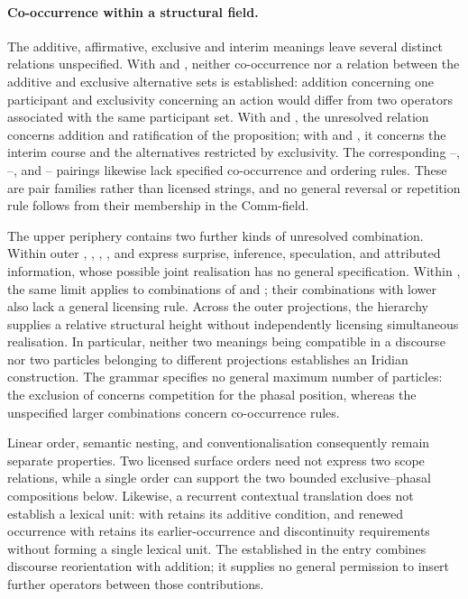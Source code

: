 \paragraph{Co-occurrence within a structural field.}
The additive, affirmative, exclusive and interim meanings leave several distinct relations
unspecified. With  and , neither
co-occurrence nor a relation between the additive and exclusive alternative
sets is established: addition concerning one participant and exclusivity
concerning an action would differ from two operators associated with the
same participant set. With  and , the unresolved
relation concerns addition and ratification of the proposition; with
 and , it concerns the interim course
and the alternatives restricted by exclusivity. The corresponding
--, --, and
-- pairings likewise lack specified
co-occurrence and ordering rules. These are pair families rather than
licensed strings, and no general reversal or repetition rule follows from
their membership in the Comm-field.

The upper periphery contains two further kinds of unresolved combination.
Within outer , , , ,
and  express surprise, inference, speculation, and attributed
information, whose possible joint realisation has no general specification.
Within , the same limit applies to combinations of
 and ; their combinations with lower 
also lack a general licensing rule. Across the outer projections,
the hierarchy supplies a relative structural height without independently
licensing simultaneous realisation. In particular, neither two meanings
being compatible in a discourse nor two particles belonging to different
projections establishes an Iridian construction. The grammar specifies no
general maximum number of particles: the exclusion of 
concerns competition for the phasal position, whereas the unspecified
larger combinations concern co-occurrence rules.

Linear order, semantic nesting, and conventionalisation consequently remain
separate properties. Two licensed surface orders need not express two
scope relations, while a single order can support the two bounded
exclusive--phasal compositions below. Likewise, a recurrent contextual
translation does not establish a lexical unit:  with
 retains its additive condition, and renewed occurrence with
 retains its earlier-occurrence and discontinuity
requirements without forming a single lexical unit. The
established  in the  entry combines
discourse reorientation with addition; it supplies no general permission
to insert further operators between those contributions.

